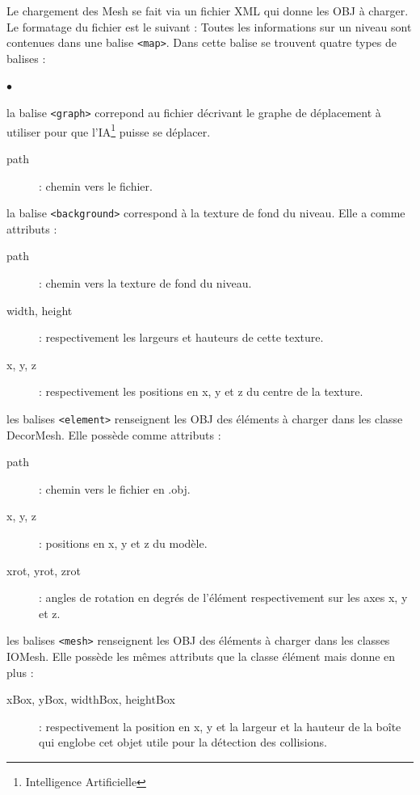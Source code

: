 Le chargement des Mesh se fait via un fichier XML qui donne les OBJ à charger. Le formatage du fichier est le suivant : Toutes les informations sur un niveau sont contenues dans une balise \verb?<map>?. Dans cette balise se trouvent quatre types de balises :


\newenvironment{malistebalise}%
{ \begin{list}%
	{$\bullet$}%
	{ \setlength{\itemsep}{30pt}}}%
{ \end{list} }

\begin{malistebalise}

	\item
	{
		la balise \verb?<graph>? correpond au fichier décrivant le graphe de déplacement à utiliser pour que l'IA\footnote{Intelligence Artificielle} puisse se déplacer.
		\begin{description}
			\item[path] : chemin vers le fichier.
		\end{description}
	}
	
	\item
	{
		la balise \verb#<background># correspond à la texture de fond du niveau. Elle a comme attributs :
		\begin{description}
			\item[path] : chemin vers la texture de fond du niveau. 
			\item[width, height] : respectivement les largeurs et hauteurs de cette texture. 
			\item[x, y, z] : respectivement les positions en x, y et z du centre de la texture.
		\end{description}
	}
	
	\item
	{
		les balises \verb#<element># renseignent les OBJ des éléments à charger dans les classe DecorMesh. Elle possède comme attributs :
		\begin{description}
			\item[path] : chemin vers le fichier en .obj. 
			\item[x, y, z] : positions en x, y et z du modèle. 
			\item[xrot, yrot, zrot] : angles de rotation en degrés de l'élément respectivement sur les axes x, y et z.
		\end{description}
	}
	
	\item
	{
		les balises \verb#<mesh># renseignent les OBJ des éléments à charger dans les classes IOMesh. Elle possède les mêmes attributs que la classe élément mais donne en plus : 
		\begin{description}
			\item[xBox, yBox, widthBox, heightBox] : respectivement la position en x, y et la largeur et la hauteur de la bo\^ite qui englobe cet objet utile pour la détection des collisions.
		\end{description}
	}
	
\end{malistebalise}


